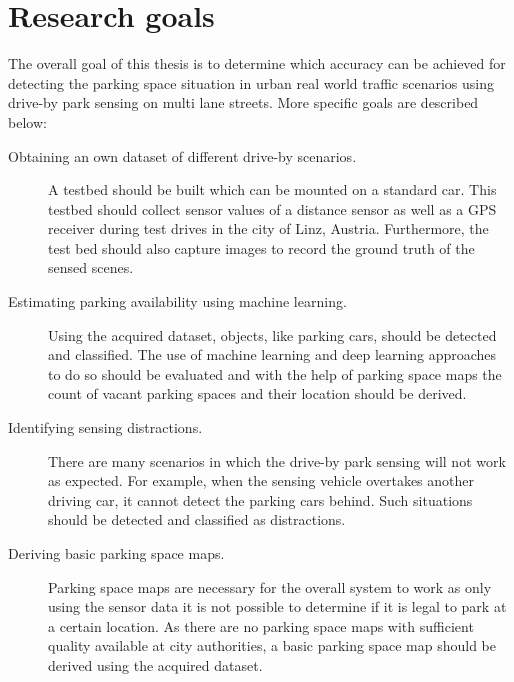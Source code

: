 
\section{Research goals}

The overall goal of this thesis is to determine which accuracy can be achieved for detecting the parking space situation in urban real world traffic scenarios using drive-by park sensing on multi lane streets. More specific goals are described below:

\begin{description}

\item[Obtaining an own dataset of different drive-by scenarios.] A testbed should be built which can be mounted on a standard car. This testbed should collect sensor values of a distance sensor as well as a GPS receiver during test drives in the city of Linz, Austria. Furthermore, the test bed should also capture images to record the ground truth of the sensed scenes.

\item[Estimating parking availability using machine learning.] Using the acquired dataset, objects, like parking cars, should be detected and classified. The use of machine learning and deep learning approaches to do so should be evaluated and with the
help of parking space maps the count of vacant parking spaces and their location should be derived.

\item[Identifying sensing distractions.] There are many scenarios in which the drive-by park sensing will not work as expected. For example, when the sensing vehicle overtakes another driving car, it cannot detect the parking cars behind. Such situations
should be detected and classified as distractions.

\item[Deriving basic parking space maps.] Parking space maps are necessary for the overall system to work as only using the sensor data it is not possible to determine if it is legal to park at a certain location. As there are no parking space maps with sufficient quality available at city authorities, a basic parking space map should be derived using the acquired dataset.

\end{description}




